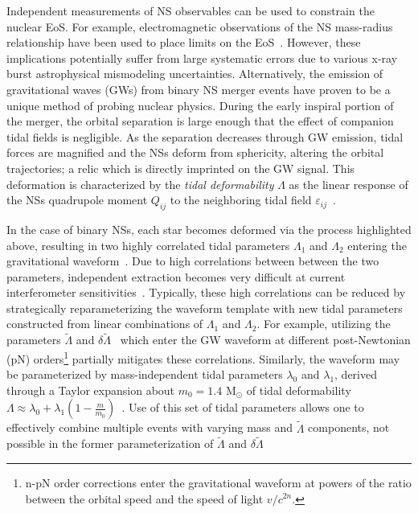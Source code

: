 \documentclass[prd,twocolumn,nofootinbib,superscriptaddress,amsmath,amssymb]{revtex4-1}
\begin{document}
Independent measurements of NS observables can be used to constrain the nuclear EoS.
For example, electromagnetic observations of the NS mass-radius relationship have been used to place limits on the EoS~\cite{guver,ozel-baym-guver,steiner-lattimer-brown,Lattimer2014,Ozel:2016oaf}.
However, these implications potentially suffer from large systematic errors due to various x-ray burst astrophysical mismodeling uncertainties.
Alternatively, the emission of gravitational waves (GWs) from binary NS merger events have proven to be a unique method of probing nuclear physics.
During the early inspiral portion of the merger, the orbital separation is large enough that the effect of companion tidal fields is negligible. 
As the separation decreases through GW emission, tidal forces are magnified and the NSs deform from sphericity, altering the orbital trajectories; a relic which is directly imprinted on the GW signal.
This deformation is characterized by the \textit{tidal deformability} $\Lambda$ as the linear response of the NSs quadrupole moment $Q_{ij}$ to the neighboring tidal field $\varepsilon_{ij}$~\cite{hinderer-love,Flanagan2008}.

In the case of binary NSs, each star becomes deformed via the process highlighted above, resulting in two highly correlated tidal parameters $\Lambda_1$ and $\Lambda_2$ entering the gravitational waveform~\cite{Flanagan2008,Vines:2011ud}.
Due to high correlations between between the two parameters, independent extraction becomes very difficult at current interferometer sensitivities~\cite{Wade:tidalCorrections}.
Typically, these high correlations can be reduced by strategically reparameterizing the waveform template with new tidal parameters constructed from linear combinations of $\Lambda_1$ and $\Lambda_2$.
For example, utilizing the parameters $\tilde{\Lambda}$ and $\delta \tilde{\Lambda}$~\cite{Favata:2013rwa,Wade:tidalCorrections} which enter the GW waveform at different post-Newtonian (pN) orders\footnote{n-pN order corrections enter the gravitational waveform at powers of the ratio between the orbital speed and the speed of light $v/c^{2n}$.} partially mitigates these correlations.
Similarly, the waveform may be parameterized by mass-independent tidal parameters $\lambda_0$ and $\lambda_1$, derived through a Taylor expansion about $m_0=1.4 \text{ M}_{\odot}$ of tidal deformability $\Lambda \approx \lambda_0+\lambda_1(1-\frac{m}{m_0})$~\cite{delPozzo:TaylorTidal,Yagi:binLove}. 
Use of this set of tidal parameters allows one to effectively combine multiple events with varying mass and $\tilde\Lambda$ components, not possible in the former parameterization of $\tilde{\Lambda}$ and $\delta \tilde{\Lambda}$
\end{document}
